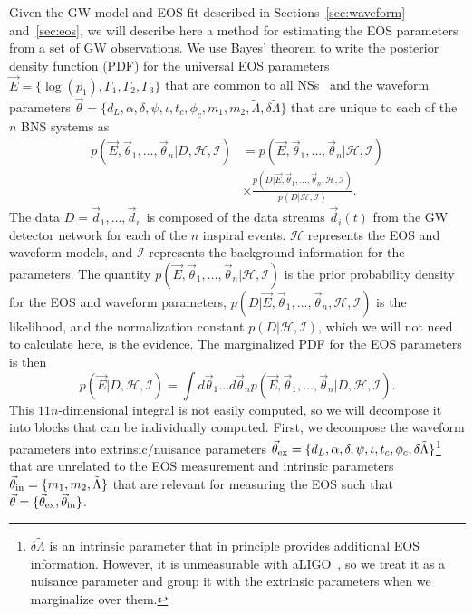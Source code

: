 \documentclass[twocolumn,prd,amssymb,aps,nofootinbib,showpacs,epsf]{revtex4}
\begin{document}
Given the GW model and EOS fit described in Sections~\ref{sec:waveform} and~\ref{sec:eos}, we will describe here a method for estimating the EOS parameters from a set of GW observations. We use Bayes' theorem to write the posterior density function (PDF) for the universal EOS parameters $\vec E = \{\log(p_1), \Gamma_1, \Gamma_2, \Gamma_3\}$ that are common to all NSs~\cite{Glendenning1996book} and the waveform parameters $\vec\theta = \{d_L, \alpha, \delta, \psi, \iota, t_c, \phi_c, m_1, m_2, \tilde\Lambda, \delta\tilde\Lambda\}$ that are unique to each of the $n$ BNS systems as
\begin{equation}
\begin{split}
p(\vec E,\vec\theta_1,\dots,\vec\theta_n | D,\mathcal{H},\mathcal{I})
&= p(\vec E,\vec\theta_1,\dots,\vec\theta_n | \mathcal{H},\mathcal{I}) \\
& \times\frac{ p(D | \vec E,\vec\theta_1,\dots,\vec\theta_n,\mathcal{H},\mathcal{I}) }{ p(D | \mathcal{H},\mathcal{I}) }.
\end{split}
\end{equation}
The data $D = \vec d_1,\dots, \vec d_n$ is composed of the data streams $\vec d_i(t)$ from the GW detector network for each of the $n$ inspiral events. $\mathcal{H}$ represents the EOS and waveform models, and $\mathcal{I}$ represents the background information for the parameters. The quantity $p(\vec E,\vec\theta_1,\dots,\vec\theta_n | \mathcal{H},\mathcal{I})$ is the prior probability density for the EOS and waveform parameters, $p(D | \vec E,\vec\theta_1,\dots,\vec\theta_n,\mathcal{H},\mathcal{I})$ is the likelihood, and the normalization constant $p(D | \mathcal{H},\mathcal{I})$, which we will not need to calculate here, is the evidence. The marginalized PDF for the EOS parameters is then
\begin{equation}
\label{eq:margEOS}
p(\vec E | D,\mathcal{H},\mathcal{I}) = \int d\vec\theta_1 \dots d\vec\theta_n p(\vec E,\vec\theta_1,\dots,\vec\theta_n | D,\mathcal{H},\mathcal{I}).
\end{equation}
This $11n$-dimensional integral is not easily computed, so we will decompose it into blocks that can be individually computed. First, we decompose the waveform parameters into extrinsic/nuisance parameters $\vec\theta_{\rm ex} = \{d_L, \alpha, \delta, \psi, \iota, t_c, \phi_c, \delta\tilde\Lambda\}$\footnote{$\delta\tilde\Lambda$ is an intrinsic parameter that in principle provides additional EOS information. However, it is unmeasurable with aLIGO~\cite{WadeCreightonOchsner2014}, so we treat it as a nuisance parameter and group it with the extrinsic parameters when we marginalize over them.} that are unrelated to the EOS measurement and intrinsic parameters $\vec\theta_{\rm in} = \{m_1, m_2, \tilde\Lambda\}$ that are relevant for measuring the EOS such that $\vec\theta = \{\vec\theta_{\rm ex}, \vec\theta_{\rm in}\}$.
\end{document}
